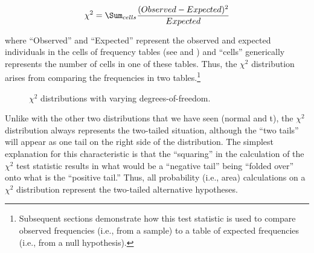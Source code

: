 \documentclass[10pt,openany]{book}\usepackage[]{graphicx}\usepackage[]{color}
\newenvironment{knitrout}{}{} %
\begin{document}
\[ \chi^{2} = \Sum_{cells}\frac{(Observed-Expected)^{2}}{Expected} \]

where ``Observed'' and ``Expected'' represent the observed and expected individuals in the cells of frequency tables (see  and ) and ``cells'' generically represents the number of cells in one of these tables.  Thus, the $\chi^2$ distribution arises from comparing the frequencies in two tables.\footnote{Subsequent sections demonstrate how this test statistic is used to compare observed frequencies (i.e., from a sample) to a table of expected frequencies (i.e., from a null hypothesis).}

\begin{knitrout}
\color{fgcolor}








\begin{figure}[hbtp]

{\centering {}

}

\caption[$\chi^2$ distributions with varying degrees-of-freedom]{$\chi^2$ distributions with varying degrees-of-freedom.}\label{fig:chiDist}
\end{figure}


\end{knitrout}

Unlike with the other two distributions that we have seen (normal and t), the $\chi^2$ distribution always represents the two-tailed situation, although the ``two tails'' will appear as one tail on the right side of the distribution.  The simplest explanation for this characteristic is that the ``squaring'' in the calculation of the $\chi^{2}$ test statistic results in what would be a ``negative tail'' being ``folded over'' onto what is the ``positive tail.''  Thus, all probability (i.e., area) calculations on a $\chi^{2}$ distribution represent the two-tailed alternative hypotheses.

\end{document}
